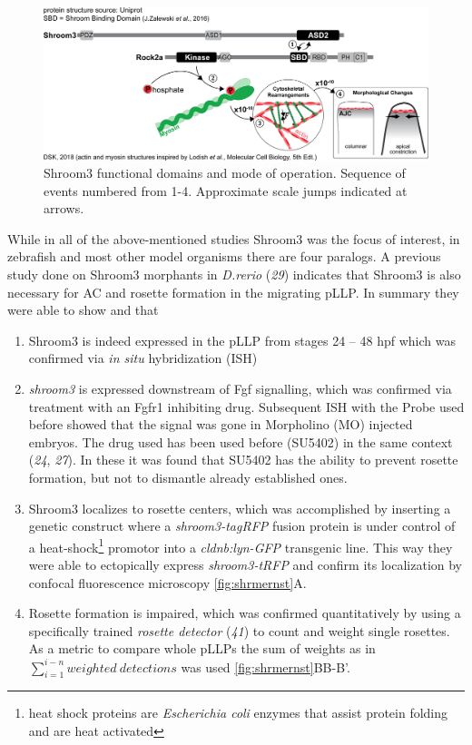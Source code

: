 \documentclass[11pt,singlespacinge,twoside]{reedthesis} %
\providecommand{\tightlist}{%
  \setlength{\itemsep}{0pt}\setlength{\parskip}{0pt}}
\begin{document}
\begin{figure}

{\centering \includegraphics[width=.95\textwidth]{figures/intro/shrm3_interaction} 

}

\caption[Shroom3 functional domains and mode of operation]{Shroom3 functional domains and mode of operation. Sequence of events numbered from 1-4. Approximate scale jumps indicated at arrows.}\label{fig:shrminteract}
\end{figure}
While in all of the above-mentioned studies Shroom3 was the focus of interest, in zebrafish and most other model organisms there are four paralogs. A previous study done on Shroom3 morphants in \emph{D.rerio} (\emph{29}) indicates that Shroom3 is also necessary for AC and rosette formation in the migrating pLLP. In summary they were able to show and that
\begin{enumerate}
\def\labelenumi{\arabic{enumi}.}
\tightlist
\item
  Shroom3 is indeed expressed in the pLLP from stages 24 -- 48 hpf which was confirmed via \emph{in situ} hybridization (ISH)
\item
  \emph{shroom3} is expressed downstream of Fgf signalling, which was confirmed via treatment with an Fgfr1 inhibiting drug. Subsequent ISH with the Probe used before showed that the signal was gone in Morpholino (MO) injected embryos. The drug used has been used before (SU5402) in the same context (\emph{24}, \emph{27}). In these it was found that SU5402 has the ability to prevent rosette formation, but not to dismantle already established ones.
\item
  Shroom3 localizes to rosette centers, which was accomplished by inserting a genetic construct where a \emph{shroom3-tagRFP} fusion protein is under control of a heat-shock\footnote{heat shock proteins are \emph{Escherichia coli} enzymes that assist protein folding and are heat activated} promotor into a \emph{cldnb:lyn-GFP} transgenic line. This way they were able to ectopically express \emph{shroom3-tRFP} and confirm its localization by confocal fluorescence microscopy \ref{fig:shrmernst}A.
\item
  Rosette formation is impaired, which was confirmed quantitatively by using a specifically trained \emph{rosette detector} (\emph{41}) to count and weight single rosettes. As a metric to compare whole pLLPs the sum of weights as in \(\sum_{i=1}^{i-n}{weighted\ detections}\) was used \ref{fig:shrmernst}BB-B'.
\end{enumerate}
\end{document}
